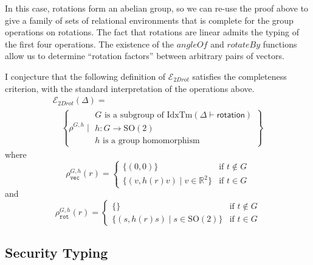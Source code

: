 \documentclass[natbib,preprint]{sigplanconf}
\newcommand{\sepbar}{\mathrel|}
\newcommand{\idxTms}[2]{\mathrm{IdxTm}(#1 \vdash #2)}
\newcommand{\tyPrimNm}[1]{\texttt{#1}}
\newcommand{\relEnv}[1]{\mathcal{#1}}
\begin{document}
\begin{enumerate}
  In this case, rotations form an abelian group, so we can re-use the
  proof above to give a family of sets of relational environments that
  is complete for the group operations on rotations. The fact that
  rotations are linear admits the typing of the first four
  operations. The existence of the $\mathit{angleOf}$ and
  $\mathit{rotateBy}$ functions allow us to determine ``rotation
  factors'' between arbitrary pairs of vectors.

  I conjecture that the following definition of
  $\relEnv{E}_{\mathit{2Drot}}$ satisfies the completeness criterion,
  with the standard interpretation of the operations above.
  \begin{displaymath}
    \begin{array}{l}
      \relEnv{E}_{\mathit{2Drot}}(\Delta) = \\
      \quad\left\{ \rho^{G,h} \sepbar
        \begin{array}{l}
          G\textrm{ is a subgroup of }\idxTms{\Delta}{\mathsf{rotation}} \\
          h : G \to \mathrm{SO}(2) \\
          h\textrm{ is a group homomorphism}
        \end{array}
      \right\}
    \end{array}
  \end{displaymath}
  where
  \begin{displaymath}
    \rho^{G,h}_{\tyPrimNm{vec}}(r) = \left\{
      \begin{array}{ll}
        \{(0,0)\} & \textrm{if }t \not\in G \\
        \{(v,h(r) v) \sepbar v \in \mathbb{R}^2 \} & \textrm{if }t \in G
      \end{array}
    \right.
  \end{displaymath}
  and
  \begin{displaymath}
    \rho^{G,h}_{\tyPrimNm{rot}}(r) = \left\{
      \begin{array}{ll}
        \{\} & \textrm{if }t \not\in G \\
        \{(s,h(r) s) \sepbar s \in \mathrm{SO}(2) \} & \textrm{if }t \in G
      \end{array}
    \right.
  \end{displaymath}
\end{enumerate}

\subsection{Security Typing}\label{sec:sec-semantics}
\end{document}
